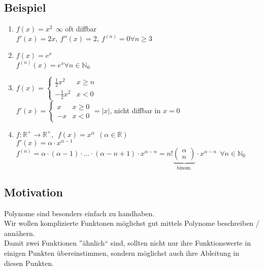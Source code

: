 \subsection{Beispiel}
\begin{enumerate}
	\item
	$f(x)=x^2 \ \ \infty$ oft diffbar\\
	$f'(x)=2x, \ f''(x)=2, \ f^{(n)}=0 \forall n\ge 3$
	
	\item
	$f(x)=e^x$\\
	$f^{(n)}(x)=e^x \forall n\in\mathbb{N}_0$
	
	\item
	$f(x)=\left\lbrace\begin{array}{ll}
	\frac{1}{2}x^2 & x\ge n\\
	-\frac{1}{2}x^2 & x< 0
	\end{array}\right.$\\
	$f'(x)=\left\lbrace\begin{array}{ll}
	x & x\ge 0\\
	-x & x<0
	\end{array}\right. = |x|$, nicht diffbar in $x=0$
	
	\item
	$f:\mathbb{R}^+\rightarrow\mathbb{R}^+, \ \ f(x)=x^\alpha \ \ (\alpha\in\mathbb{R})$\\
	$f'(x)=\alpha\cdot x^{\alpha-1}$\\
	$f^{(n)}=\alpha\cdot (\alpha-1)\cdot \dots\cdot (\alpha-n+1)\cdot x^{\alpha-n} = n!\underbrace{\begin{pmatrix}\alpha \\ n\end{pmatrix}}_{\text{binom.}}\cdot x^{\alpha-n} \ \ \forall n\in\mathbb{N}_0$
\end{enumerate}

\subsection{Motivation}
Polynome sind besonders einfach zu handhaben.\\
Wir wollen komplizierte Funktonen möglichst gut mittels Polynome beschreiben / annähern.\\
Damit zwei Funktionen ''ähnlich`` sind, sollten nicht nur ihre Funktionswerte in einigen Punkten übereinstimmen, sondern möglichst auch ihre Ableitung in diesen Punkten.


